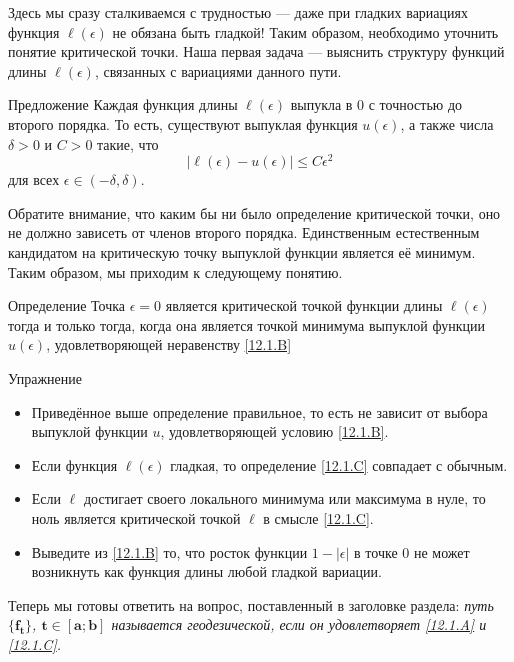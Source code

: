 Здесь мы сразу сталкиваемся с трудностью --- даже при гладких вариациях функция $\ell(\epsilon)$ не обязана быть гладкой!
Таким образом, необходимо уточнить понятие критической точки.
Наша первая задача --- выяснить структуру функций длины $\ell(\epsilon)$, связанных с вариациями данного пути.

\begin{ex}{Предложение}\label{12.1.B}
Каждая функция длины $\ell(\epsilon)$ выпукла в $0$ с точностью до второго порядка.
То есть, существуют выпуклая функция $u(\epsilon)$, а также числа $\delta > 0$ и $C > 0$ такие, что 
\[|\ell(\epsilon) - u(\epsilon)| \le C\epsilon^2\]
для всех $\epsilon \in (-\delta, \delta)$.
\end{ex}

Обратите внимание, что каким бы ни было определение критической точки, оно не должно зависеть от членов второго порядка.
Единственным естественным кандидатом на критическую точку выпуклой функции является её минимум.
Таким образом, мы приходим к следующему понятию.

\begin{ex}{Определение}\label{12.1.C}
Точка $\epsilon = 0$ является критической точкой функции длины $\ell(\epsilon)$ тогда и только тогда, когда она является точкой минимума выпуклой функции $u(\epsilon)$, удовлетворяющей неравенству \ref{12.1.B}
\end{ex}

\begin{ex}{Упражнение}\label{12.1.D}
\begin{itemize}

\item Приведённое выше определение правильное, то есть не зависит от выбора выпуклой функции $u$, удовлетворяющей условию \ref{12.1.B}.


\item Если функция $\ell(\epsilon)$ гладкая, то определение \ref{12.1.C} совпадает с обычным.


\item Если $\ell$ достигает своего локального минимума или максимума в
  нуле, то ноль является критической точкой $\ell$ в смысле
  \ref{12.1.C}. 


\item Выведите из \ref{12.1.B} то, что росток функции $1 - |\epsilon|$
  в точке $0$ не может возникнуть как функция длины любой гладкой
  вариации.
\end{itemize}
\end{ex}

Теперь мы готовы ответить на вопрос, поставленный в заголовке раздела: \emph{путь $\bm{\{f_t\}}$, $\bm{t\in[a; b]}$ называется геодезической, если он удовлетворяет \ref{12.1.A} и \ref{12.1.C}.}

